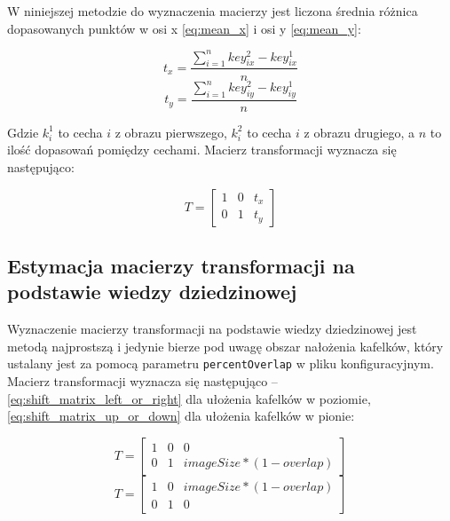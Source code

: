 W niniejszej metodzie do wyznaczenia macierzy jest liczona średnia różnica dopasowanych punktów w osi x \ref{eq:mean_x} i osi y \ref{eq:mean_y}:

\begin{equation}
t_x = \frac{\sum_{i=1}^{n} key_{ix}^{2} - key_{ix}^{1}}{n}
\label{eq:mean_x}
\end{equation}
\begin{equation}
t_y = \frac{\sum_{i=1}^{n} key_{iy}^{2} - key_{iy}^{1}}{n}
\label{eq:mean_y}
\end{equation}

Gdzie $k_i^{1}$ to cecha $i$ z obrazu pierwszego, $k_i^{2}$ to cecha $i$ z obrazu drugiego, a $n$ to ilość dopasowań pomiędzy cechami. Macierz transformacji wyznacza się następująco:

\begin{equation}
T = \begin{bmatrix}
  1 & 0 & t_x \\
  0 & 1 & t_y
\end{bmatrix}
\end{equation}

\subsection{Estymacja macierzy transformacji na podstawie wiedzy dziedzinowej}

Wyznaczenie macierzy transformacji na podstawie wiedzy dziedzinowej jest metodą najprostszą i jedynie bierze pod uwagę obszar nałożenia kafelków, który ustalany jest za pomocą parametru \texttt{percentOverlap} w pliku konfiguracyjnym. Macierz transformacji wyznacza się następująco -- \ref{eq:shift_matrix_left_or_right} dla ułożenia kafelków w poziomie, \ref{eq:shift_matrix_up_or_down} dla ułożenia kafelków w pionie:

\begin{equation}
T = \begin{bmatrix}
  1 & 0 & 0 \\
  0 & 1 & imageSize * (1 - overlap)
\end{bmatrix}
\label{eq:shift_matrix_up_or_down}
\end{equation}
\begin{equation}
T = \begin{bmatrix}
  1 & 0 & imageSize * (1 - overlap) \\
  0 & 1 & 0
\end{bmatrix}
\label{eq:shift_matrix_left_or_right}
\end{equation}

